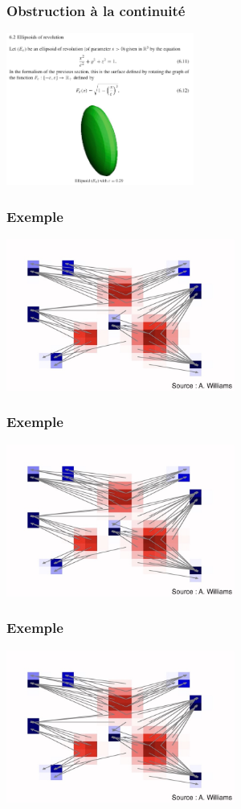 \documentclass[9pt]{beamer}
\begin{document}
\begin{frame}
\frametitle{\bf Obstruction à la continuité}
 
\centering \includegraphics[height=5.0cm]{figal2}

\end{frame}

\begin{frame}
\frametitle{\bf Exemple}
 
\centering \includegraphics[height=5.0cm]{ex3}

\end{frame}

\begin{frame}
\frametitle{\bf Exemple}
 
\centering \includegraphics[height=5.0cm]{ex3}

\end{frame}

\begin{frame}
\frametitle{\bf Exemple}
 
\centering \includegraphics[height=5.0cm]{ex3}

\end{frame}
\end{document}
